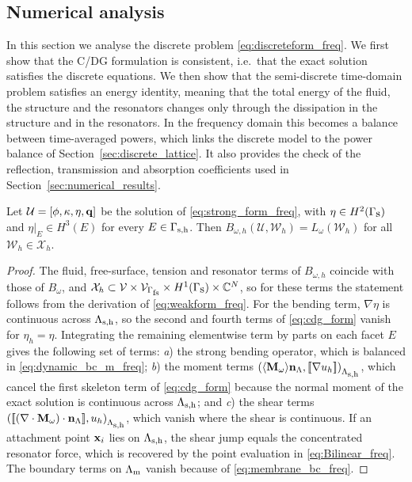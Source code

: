 \subsection{Numerical analysis}\label{subsec:num_analysis}
In this section we analyse the discrete problem \eqref{eq:discreteform_freq}. We first show that the C/DG formulation is consistent, i.e.\ that the exact solution satisfies the discrete equations. We then show that the semi-discrete time-domain problem satisfies an energy identity, meaning that the total energy of the fluid, the structure and the resonators changes only through the dissipation in the structure and in the resonators. In the frequency domain this becomes a balance between time-averaged powers, which links the discrete model to the power balance of Section~\ref{sec:discrete_lattice}. It also provides the check of the reflection, transmission and absorption coefficients used in Section~\ref{sec:numerical_results}. 

\begin{proposition}[Consistency]\label{prop:consistency}
Let $\mathcal{U}=[\phi,\kappa,\eta,\mathbf{q}]$ be the solution of \eqref{eq:strong_form_freq}, with $\eta\in H^2(\Gamma_{\mbox{s}})$ and $\eta|_E\in H^3(E)$ for every $E\in\Gamma_{\mbox{\scriptsize s,h}}$. Then $B_{\omega,h}(\mathcal{U},\mathcal{W}_h)=L_\omega(\mathcal{W}_h)$ for all $\mathcal{W}_h\in\mathcal{X}_h$.
\end{proposition}
\begin{proof}
The fluid, free-surface, tension and resonator terms of $B_{\omega,h}$ coincide with those of $B_\omega$, and $\mathcal{X}_h\subset\mathcal{V}\times\mathcal{V}_{\Gamma_{\mbox{\scriptsize fs}}}\times H^1(\Gamma_{\mbox{s}})\times\mathbb{C}^N$, so for these terms the statement follows from the derivation of \eqref{eq:weakform_freq}. For the bending term, $\nabla\eta$ is continuous across $\Lambda_{\mbox{\scriptsize s,h}}$, so the second and fourth terms of \eqref{eq:cdg_form} vanish for $\eta_h=\eta$. Integrating the remaining elementwise term by parts on each facet $E$ gives the following set of terms: \textit{a}) the strong bending operator, which is balanced in \eqref{eq:dynamic_bc_m_freq}; \textit{b}) the moment terms $\left(\langle\mathbf{M}_\omega\rangle\mathbf{n}_\Lambda,[\![\nabla u_h]\!]\right)_{\Lambda_{\mbox{\scriptsize s,h}}}$, which cancel the first skeleton term of \eqref{eq:cdg_form} because the normal moment of the exact solution is continuous across $\Lambda_{\mbox{\scriptsize s,h}}$; and \textit{c}) the shear terms $\left([\![(\nabla\cdot\mathbf{M}_\omega)\cdot\mathbf{n}_\Lambda]\!],u_h\right)_{\Lambda_{\mbox{\scriptsize s,h}}}$,  which vanish where the shear is continuous. If an attachment point $\mathbf{x}_i$ lies on $\Lambda_{\mbox{\scriptsize s,h}}$, the shear jump equals the concentrated resonator force, which is recovered by the point evaluation in \eqref{eq:Bilinear_freq}.
The boundary terms on $\Lambda_{\mbox{\scriptsize m}}$ vanish because of \eqref{eq:membrane_bc_freq}.
\end{proof}

